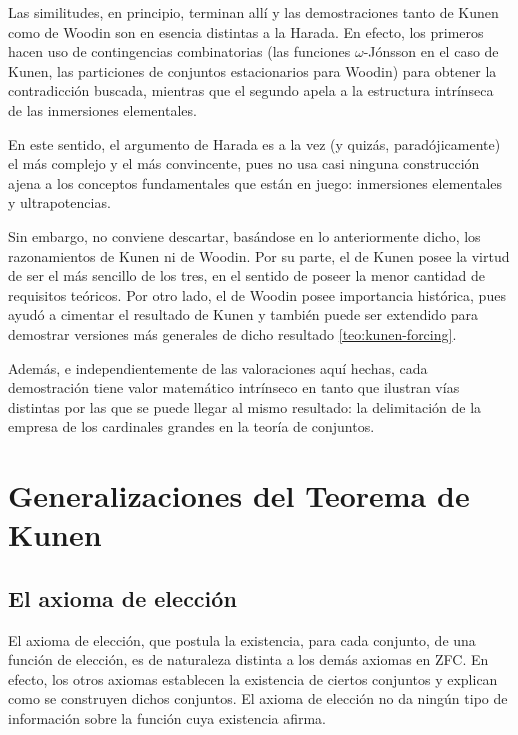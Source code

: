 Las similitudes, en principio, terminan allí y las demostraciones tanto de Kunen
como de Woodin son en esencia distintas a la Harada.
En efecto, los primeros hacen uso de contingencias combinatorias
(las funciones $\omega$-Jónsson en el caso de Kunen,
las particiones de conjuntos estacionarios para Woodin)
para obtener la contradicción buscada, mientras que el segundo
apela a la estructura intrínseca de las inmersiones elementales.

En este sentido, el argumento de Harada es a la vez (y quizás, paradójicamente)
el más complejo y el más convincente, pues no usa casi ninguna construcción
ajena a los conceptos fundamentales que están en juego: inmersiones elementales
y ultrapotencias.

Sin embargo, no conviene descartar, basándose en lo anteriormente dicho,
los razonamientos de Kunen ni de Woodin. Por su parte, el de Kunen posee
la virtud de ser el más sencillo de los tres, en el sentido de poseer
la menor cantidad de requisitos teóricos. Por otro lado, el de Woodin
posee importancia histórica, pues ayudó a cimentar el resultado
de Kunen y también puede ser extendido para demostrar versiones
más generales de dicho resultado \ref{teo:kunen-forcing}.

Además, e independientemente de las valoraciones aquí hechas,
cada demostración tiene valor matemático intrínseco en tanto
que ilustran vías distintas por las que se puede llegar al mismo
resultado: la delimitación de la empresa de los cardinales grandes
en la teoría de conjuntos.

\chapter{Generalizaciones del Teorema de Kunen}
\thispagestyle{empty}


\section{El axioma de elección}

El axioma de elección, que postula la existencia,
para cada conjunto, de una función de elección,
es de naturaleza distinta a los demás axiomas en ZFC.
En efecto, los otros axiomas establecen la existencia
de ciertos conjuntos y explican como se construyen dichos
conjuntos. El axioma de elección no da ningún tipo de información
sobre la función cuya existencia afirma.

